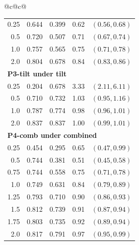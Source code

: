 \begin{tabular}{@{}c@{\hspace{1.5em}}c@{}}
\begin{tabular}[t]{rcccc}
0.25 & 0.644 & 0.399 & 0.62 & $(0.56,0.68)$ \\
0.5 & 0.720 & 0.507 & 0.71 & $(0.67,0.74)$ \\
1.0 & 0.757 & 0.565 & 0.75 & $(0.71,0.78)$ \\
2.0 & 0.804 & 0.678 & 0.84 & $(0.83,0.86)$ \\
\midrule
\multicolumn{5}{l}{\textbf{P3-tilt under tilt}} \\
0.25 & 0.204 & 0.678 & 3.33 & $(2.11,6.11)$ \\
0.5 & 0.710 & 0.732 & 1.03 & $(0.95,1.16)$ \\
1.0 & 0.787 & 0.774 & 0.98 & $(0.96,1.01)$ \\
2.0 & 0.837 & 0.837 & 1.00 & $(0.99,1.01)$ \\
\midrule
\multicolumn{5}{l}{\textbf{P4-comb under combined}} \\
0.25 & 0.454 & 0.295 & 0.65 & $(0.47,0.99)$ \\
0.5 & 0.744 & 0.381 & 0.51 & $(0.45,0.58)$ \\
0.75 & 0.744 & 0.558 & 0.75 & $(0.71,0.78)$ \\
1.0 & 0.749 & 0.631 & 0.84 & $(0.79,0.89)$ \\
1.25 & 0.793 & 0.710 & 0.90 & $(0.86,0.93)$ \\
1.5 & 0.812 & 0.739 & 0.91 & $(0.87,0.94)$ \\
1.75 & 0.803 & 0.735 & 0.92 & $(0.89,0.94)$ \\
2.0 & 0.817 & 0.791 & 0.97 & $(0.95,0.99)$ \\
\bottomrule
\end{tabular}
\end{tabular}
